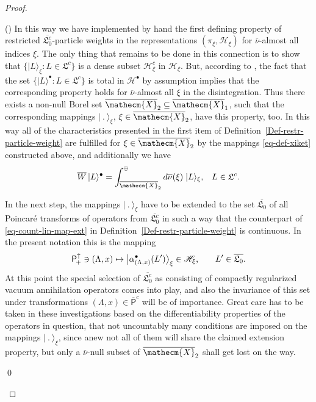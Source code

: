 \documentclass[11pt,twoside,openright]{report}
\theoremstyle{definition}
\theoremstyle{plain}
\theoremstyle{remark}
\theoremstyle{assumption}
\newcommand{\bset}[1]{\bigl\{ #1 \bigr\}}
\newcommand{\bullket}[1]{\vert #1 \rangle^\bullet}
\newcommand{\xiket}[1]{\vert #1 \rangle_\xi}
\newcommand{\bxiket}[1]{\big\vert #1 \bigr\rangle_\xi}
\newcommand{\Hscr}{\mathscr{H}}
\newcommand{\Xecmbar}{\overline{\mathecm{X}}}
\newcommand{\Wbar}{\overline{W}}
\newcommand{\nubar}{\overline{\nu}}
\newcommand{\Poin}{\mathsf{P}_{\negthinspace +}^\uparrow}
\newcommand{\abulletLax}{\alpha^\bullet_{( \Lambda , x )}}
\newcommand{\Pbarcount}{\overline{\mathsf{P}}^c}
\newcommand{\idealcount}{\mathfrak{L}^c}
\newcommand{\vacbar}{\overline{\mathfrak{L}_0}}
\newcommand{\vaccountbar}{\overline{\mathfrak{L}_0^c}}
\newcommand{\Hbullet}{\mathscr{H}^\bullet}
\newcounter{proofitem}
\newenvironment{prooflist}{\begin{list}{(\roman{proofitem})}%
  {\usecounter{proofitem} \setlength{\topsep}{0ex}%
   \setlength{\parsep}{0.2ex} \setlength{\itemsep}{0.4ex}%
   \setlength{\leftmargin}{0em} \setlength{\itemindent}{0.5em}%
   \setlength{\listparindent}{1em}}}{\qed \end{list}}
\begin{document}
\begin{proof}
\begin{prooflist}
    In this way we have implemented by hand the first defining
    property of restricted $\vaccountbar$-particle weights in the
    representations $( \pi_\xi , \Hscr_\xi)$ for $\nubar$-almost all
    indices $\xi$. The only thing that remains to be done in this
    connection is to show that $\bset{\xiket{L} : L \in \idealcount}$
    is a dense subset $\Hscr_\xi^c$ in $\Hscr_\xi$. But, according to
    \cite[Section~II.1.6, Proposition~8]{dixmier:1981}, the fact that
    the set $\bset{\bullket{L} : L \in \idealcount}$ is total in
    $\Hbullet$ by assumption implies that the corresponding property
    holds for $\nubar$-almost all $\xi$ in the disintegration. Thus
    there exists a non-null Borel set $\Xecmbar_2 \subseteq
    \Xecmbar_1$, such that the corresponding mappings $\xiket{~.~}$,
    $\xi \in \Xecmbar_2$, have this property, too. In this way all of
    the characteristics presented in the first item of
    Definition~\ref{Def-restr-particle-weight} are fulfilled for $\xi
    \in \Xecmbar_2$ by the mappings \eqref{eq-def-xiket} constructed
    above, and additionally we have
    \begin{equation}
      \label{eq-spatial-disintegration-of-idealcount-vectors}
      \Wbar \, \bullket{L} = \int_{\Xecmbar_2}^\oplus d \nubar ( \xi )
      \; \xiket{L} \text{,} \quad L \in \idealcount \text{.}
    \end{equation}
  \item In the next step, the mappings $\xiket{~.~}$ have to be
    extended to the set $\vacbar$ of all Poincar\'{e} transforms of
    operators from $\vaccountbar$ in such a way that the counterpart
    of \eqref{eq-count-lin-map-ext} in
    Definition~\ref{Def-restr-particle-weight} is continuous. In the
    present notation this is the mapping
    \begin{equation}
      \label{eq-xiket-ext}
      \Poin \ni ( \Lambda , x ) \mapsto \bxiket{\abulletLax ( L' )}
      \in \Hscr_\xi \text{,} \qquad L' \in \vacbar \text{.}
    \end{equation}
    At this point the special selection of $\vaccountbar$ as
    consisting of compactly regularized vacuum annihilation operators
    comes into play, and also the invariance of this set under
    transformations $( \Lambda , x ) \in  \Pbarcount$ will be of
    importance. Great care has to be taken in these investigations
    based on the differentiability properties of the operators in
    question, that not uncountably many conditions are imposed on the
    mappings $\xiket{~.~}$, since anew not all of them will share the
    claimed extension property, but only a $\nubar$-null subset of
    $\Xecmbar_2$ shall get lost on the way.


\end{prooflist}
\end{proof}
\end{document}
